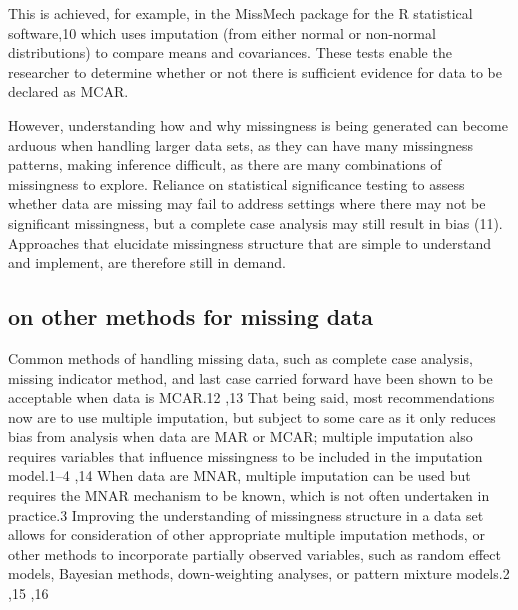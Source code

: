 \documentclass[]{article}
\begin{document}
This is achieved, for example, in the MissMech package for the R
statistical software,10 which uses imputation (from either normal or
non-normal distributions) to compare means and covariances. These tests
enable the researcher to determine whether or not there is sufficient
evidence for data to be declared as MCAR.

However, understanding how and why missingness is being generated can
become arduous when handling larger data sets, as they can have many
missingness patterns, making inference difficult, as there are many
combinations of missingness to explore. Reliance on statistical
significance testing to assess whether data are missing may fail to
address settings where there may not be significant missingness, but a
complete case analysis may still result in bias (11). Approaches that
elucidate missingness structure that are simple to understand and
implement, are therefore still in demand.

\subsection{on other methods for missing
data}\label{on-other-methods-for-missing-data}

Common methods of handling missing data, such as complete case analysis,
missing indicator method, and last case carried forward have been shown
to be acceptable when data is MCAR.12 ,13 That being said, most
recommendations now are to use multiple imputation, but subject to some
care as it only reduces bias from analysis when data are MAR or MCAR;
multiple imputation also requires variables that influence missingness
to be included in the imputation model.1--4 ,14 When data are MNAR,
multiple imputation can be used but requires the MNAR mechanism to be
known, which is not often undertaken in practice.3 Improving the
understanding of missingness structure in a data set allows for
consideration of other appropriate multiple imputation methods, or other
methods to incorporate partially observed variables, such as random
effect models, Bayesian methods, down-weighting analyses, or pattern
mixture models.2 ,15 ,16
\end{document}
